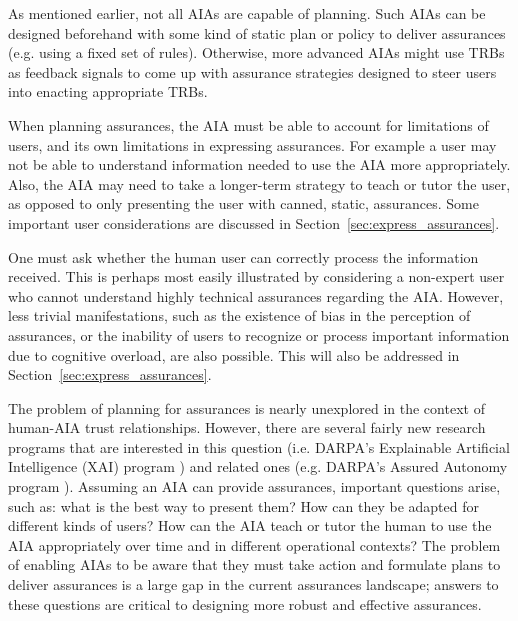     As mentioned earlier, not all AIAs are capable of planning. 
    Such AIAs can be designed beforehand with some kind of static plan or policy to deliver assurances (e.g. using a fixed set of rules). 
    Otherwise, more advanced AIAs might use TRBs as feedback signals to come up with assurance strategies designed to steer users into enacting appropriate TRBs. 

    When planning assurances, the AIA must be able to account for limitations of users, and its own limitations in expressing assurances. For example a user may not be able to understand information needed to use the AIA more appropriately. Also, the AIA may need to take a longer-term strategy to teach or tutor the user, as opposed to only presenting the user with canned, static, assurances. Some important user considerations are discussed in Section~\ref{sec:express_assurances}.
    
    One must ask whether the human user can correctly process the information received. This is perhaps most easily illustrated by considering a non-expert user who cannot understand highly technical assurances regarding the AIA. However, less trivial manifestations, such as the existence of bias in the perception of assurances, or the inability of users to recognize or process important information due to cognitive overload, are also possible. This will also be addressed in Section~\ref{sec:express_assurances}.

    The problem of planning for assurances is nearly unexplored in the context of human-AIA trust relationships. However, there are several fairly new research programs that are interested in this question (i.e. DARPA's Explainable Artificial Intelligence (XAI) program \cite{Gunning2016-kb}) and related ones (e.g. DARPA's Assured Autonomy program \cite{Neema2017-bb}). Assuming an AIA can provide assurances, important questions arise, such as: what is the best way to present them? How can they be adapted for different kinds of users? How can the AIA teach or tutor the human to use the AIA appropriately over time and in different operational contexts? The problem of enabling AIAs to be aware that they must take action and formulate plans to deliver assurances is a large gap in the current assurances landscape; answers to these questions are critical to designing more robust and effective assurances.


